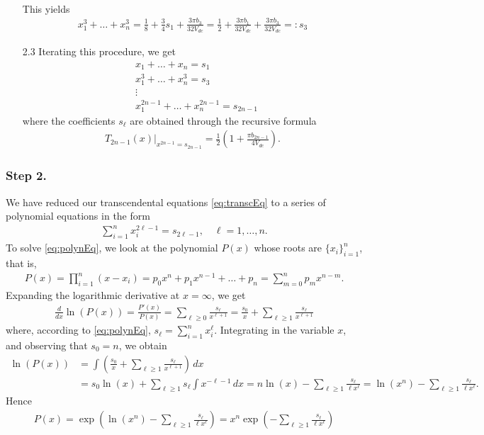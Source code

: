 \documentclass[a4paper]{report}
\begin{document}
\begin{itemize}
\begin{align*}
	\end{align*}
	This yields
	\begin{align}
		x_1^3 + \ldots + x_n^3 = \frac 18 + \frac 34 s_1 + \frac{3\pi b_3}{32V_{dc}} = \frac 12 + \frac{3\pi b_1}{32V_{dc}} + \frac{3\pi b_3}{32V_{dc}} =:s_3
	\end{align}
	\item[2.3] Iterating this procedure, we get
	\begin{align}\label{eq:xequations}
		&x_1 + \ldots + x_n = s_1
		\\
		&x_1^3 + \ldots + x_n^3 = s_3 
		\\
		&\vdots
		\\
		&x_1^{2n-1} + \ldots + x_n^{2n-1} = s_{2n-1}
	\end{align}
	where the coefficients $s_\ell$ are obtained through the recursive formula
	\begin{align*}
		T_{2n-1}(x)|_{x^{2n-1} = s_{2n-1}} = \frac 12\left(1+\frac{\pi b_{2n-1}}{4V_{dc}}\right).
	\end{align*}
\end{itemize}

\subsubsection*{Step 2.} We have reduced our transcendental equations \eqref{eq:transcEq} to a series of polynomial equations in the form
\begin{align}\label{eq:polynEq}
	\sum_{i=1}^n x_i^{2\ell-1} = s_{2\ell-1}, \quad \ell = 1,\ldots,n.
\end{align}
To solve \eqref{eq:polynEq}, we look at the polynomial $P(x)$ whose roots are $\{x_i\}_{i=1}^n$, that is,
\begin{align*}
	P(x) = \prod_{i=1}^n (x-x_i) = p_0x^n + p_1x^{n-1} + \ldots + p_n = \sum_{m=0}^n p_m x^{n-m}.
\end{align*}
Expanding the logarithmic derivative at $x=\infty$, we get
\begin{align*}
	\frac{d}{dx}\ln(P(x)) = \frac{P'(x)}{P(x)} = \sum_{\ell\geq 0} \frac{s_\ell}{x^{\ell+1}} = \frac{s_0}{x} + \sum_{\ell\geq 1} \frac{s_\ell}{x^{\ell+1}}
\end{align*}
where, according to \eqref{eq:polynEq}, $s_\ell = \sum_{i=1}^n x_i^\ell$. Integrating in the variable $x$, and observing that $s_0=n$, we obtain
\begin{align*}
	\ln(P(x)) &= \int \left(\frac{s_0}{x} + \sum_{\ell\geq 1}\frac{s_\ell}{x^{\ell+1}}\right)\,dx 
	\\
	&= s_0\ln(x) + \sum_{\ell\geq 1} s_\ell\int x^{-\ell-1}\,dx = n\ln(x) - \sum_{\ell\geq 1} \frac{s_\ell}{\ell x^\ell} = \ln(x^n) - \sum_{\ell\geq 1} \frac{s_\ell}{\ell x^\ell}.
\end{align*}
Hence
\begin{align*}
	P(x) = \exp\left(\ln(x^n) - \sum_{\ell\geq 1} \frac{s_\ell}{\ell x^\ell}\right) = x^n\exp\left(-\sum_{\ell\geq 1} \frac{s_\ell}{\ell x^\ell}\right)
\end{align*}
\end{document}
